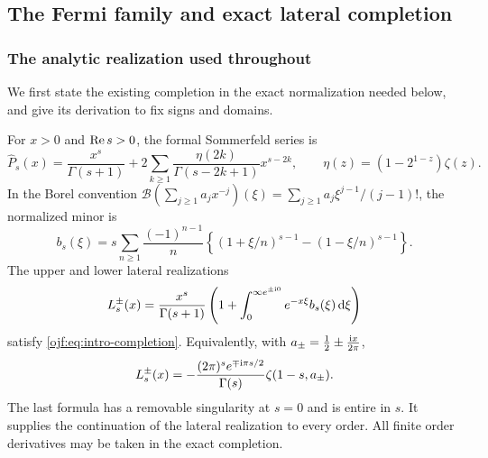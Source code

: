 \subsection{The Fermi family and exact lateral completion}
\label{ojf:sec:completion}

\subsubsection{The analytic realization used throughout}
We first state the existing completion in the exact normalization needed
below, and give its derivation to fix signs and domains.

\begin{proposition}
\label{ojf:prop:completion}
For $x>0$ and $\operatorname{Re} s>0$, the formal Sommerfeld series is
\begin{equation}\label{ojf:eq:sommerfeld}
 \widehat P_s(x)=\frac{x^s}{\Gamma(s+1)}+
       2\sum_{k\ge1}\frac{\eta(2k)}{\Gamma(s-2k+1)}x^{s-2k},
 \qquad \eta(z)=(1-2^{1-z})\zeta(z).
\end{equation}
In the Borel convention
$\mathcal{B}(\sum_{j\ge1}a_jx^{-j})(\xi)=
 \sum_{j\ge1}a_j\xi^{j-1}/(j-1)!$,
the normalized minor is
\begin{equation}\label{ojf:eq:lattice}
 b_s(\xi)=s\sum_{n\ge1}\frac{(-1)^{n-1}}n
 \left\{(1+\xi/n)^{s-1}-(1-\xi/n)^{s-1}\right\}.
\end{equation}
The upper and lower lateral realizations
\begin{equation}\label{ojf:eq:lateral-borel}
 L_s^\pm(x)=\frac{x^s}{\Gamma(s+1)}
       \left(1+\int_{0}^{\infty e^{\pm\mathrm{i}0}}
                      e^{-x\xi}b_s(\xi)\,\mathrm d\xi\right)
\end{equation}
satisfy \eqref{ojf:eq:intro-completion}. Equivalently, with
$a_\pm=\frac12\pm\frac{\mathrm{i} x}{2\pi}$,
\begin{equation}\label{ojf:eq:hurwitz-completion}
 L_s^\pm(x)=-\frac{(2\pi)^se^{\mp\mathrm{i}\pi s/2}}{\Gamma(s)}
                     \zeta(1-s,a_\pm).
\end{equation}
The last formula has a removable singularity at $s=0$ and is entire in
$s$. It supplies the continuation of the lateral realization to every
order. All finite order derivatives may be taken in the exact completion.
\end{proposition}

